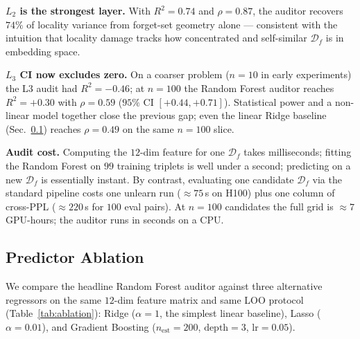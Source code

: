 \documentclass[11pt]{article}
\newcommand{\Df}{\mathcal{D}_f}
\newcommand{\Ltwo}{L_2}
\newcommand{\Lthree}{L_3}
\begin{document}
\textbf{$\Ltwo$ is the strongest layer.} With $R^2{=}0.74$ and $\rho{=}0.87$, the auditor recovers $74\%$ of locality variance from forget-set geometry alone --- consistent with the intuition that locality damage tracks how concentrated and self-similar $\Df$ is in embedding space.

\textbf{$\Lthree$ CI now excludes zero.} On a coarser problem ($n{=}10$ in early experiments) the L3 audit had $R^2{=}-0.46$; at $n{=}100$ the Random Forest auditor reaches $R^2{=}+0.30$ with $\rho{=}0.59$ ($95\%$ CI $[+0.44, +0.71]$). Statistical power and a non-linear model together close the previous gap; even the linear Ridge baseline (Sec.~\ref{sec:ablation}) reaches $\rho{=}0.49$ on the same $n{=}100$ slice.

\textbf{Audit cost.} Computing the $12$-dim feature for one $\Df$ takes milliseconds; fitting the Random Forest on $99$ training triplets is well under a second; predicting on a new $\Df$ is essentially instant. By contrast, evaluating one candidate $\Df$ via the standard pipeline costs one unlearn run ($\approx 75$\,s on H100) plus one column of cross-PPL ($\approx 220$\,s for $100$ eval pairs). At $n{=}100$ candidates the full grid is $\approx 7$ GPU-hours; the auditor runs in seconds on a CPU.

\subsection{Predictor Ablation}
\label{sec:ablation}

We compare the headline Random Forest auditor against three alternative
regressors on the same $12$-dim feature matrix and same LOO protocol
(Table~\ref{tab:ablation}): Ridge ($\alpha{=}1$, the simplest linear
baseline), Lasso ($\alpha{=}0.01$), and Gradient Boosting ($n_{\text{est}}{=}200$, $\text{depth}{=}3$, $\text{lr}{=}0.05$).
\end{document}
